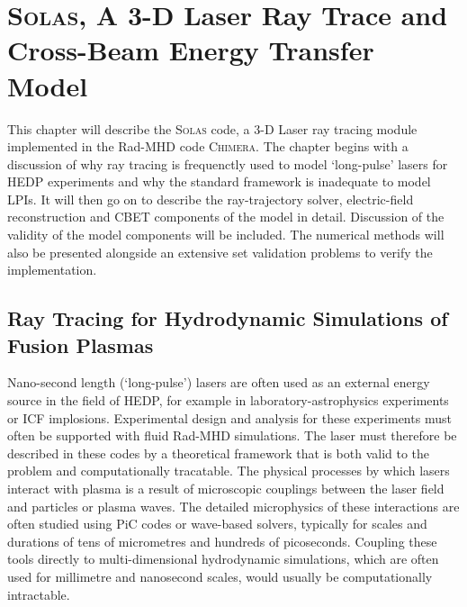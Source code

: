 \chapter{\textsc{Solas}, A 3-D Laser Ray Trace and Cross-Beam Energy Transfer Model} \label{chap:SOLAS}



This chapter will describe the \textsc{Solas} code, a 3-D Laser ray tracing module implemented in the \ac{Rad-MHD} code \textsc{Chimera}.
The chapter begins with a discussion of why ray tracing is frequenctly used to model `long-pulse' lasers for \ac{HEDP} experiments and why the standard framework is inadequate to model \ac{LPIs}.
It will then go on to describe the ray-trajectory solver, electric-field reconstruction and \ac{CBET} components of the model in detail.
Discussion of the validity of the model components will be included.
The numerical methods will also be presented alongside an extensive set validation problems to verify the implementation.


\section{Ray Tracing for Hydrodynamic Simulations of Fusion Plasmas}

Nano-second length (`long-pulse') lasers are often used as an external energy source in the field of \ac{HEDP}, for example in laboratory-astrophysics experiments or \ac{ICF} implosions.
Experimental design and analysis for these experiments must often be supported with fluid \ac{Rad-MHD} simulations.
The laser must therefore be described in these codes by a theoretical framework that is both valid to the problem and computationally tracatable.
The physical processes by which lasers interact with plasma is a result of microscopic couplings between the laser field and particles or plasma waves.
The detailed microphysics of these interactions are often studied using \ac{PiC} codes or wave-based solvers, typically for scales and durations of tens of micrometres and hundreds of picoseconds.
Coupling these tools directly to multi-dimensional hydrodynamic simulations, which are often used for millimetre and nanosecond scales, would usually be computationally intractable.

